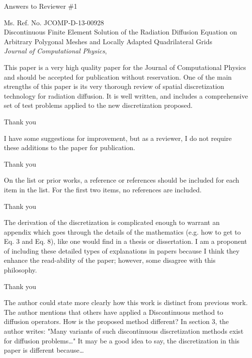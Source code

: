 \documentclass{article}
\begin{document}
\begin{center}
{ \Large Answers to Reviewer \#1}
\end{center}

\bigskip

\noindent Ms. Ref. No. JCOMP-D-13-00928\\
Discontinuous Finite Element Solution of the Radiation Diffusion Equation on Arbitrary Polygonal Meshes and Locally Adapted Quadrilateral Grids\\
{\it Journal of Computational Physics},\\

\bigskip
\bigskip

{
\color{blue}
This paper is a very high quality paper for the Journal of Computational Physics and should be
accepted for publication without reservation. One of the main strengths of this paper is its very thorough
review of spatial discretization technology for radiation diffusion. It is well written, and includes a
comprehensive set of test problems applied to the new discretization proposed.
}

Thank you
\bigskip


{
\color{blue}
I have some suggestions for improvement, but as a reviewer, I do not require these additions to the paper
for publication.
}


Thank you
\bigskip



{
\color{blue}
On the list or prior works, a reference or references should be included for each item in the list. For the
first two items, no references are included.
}


Thank you
\bigskip

{
\color{blue}
The derivation of the discretization is complicated enough to warrant an appendix which goes through
the details of the mathematics (e.g. how to get to Eq. 3 and Eq. 8), like one would find in a thesis or
dissertation. I am a proponent of including these detailed types of explanations in papers because I think
they enhance the read-ability of the paper; however, some disagree with this philosophy.
}


Thank you
\bigskip

{
\color{blue}
The author could state more clearly how this work is distinct from previous work. The author mentions
that others have applied a Discontinuous method to diffusion operators. How is the proposed method
different? In section 3, the author writes: "Many variants of such discontinuous discretization methods
exist for diffusion problems…" It may be a good idea to say, the discretization in this paper is different
because…
}
\end{document}
